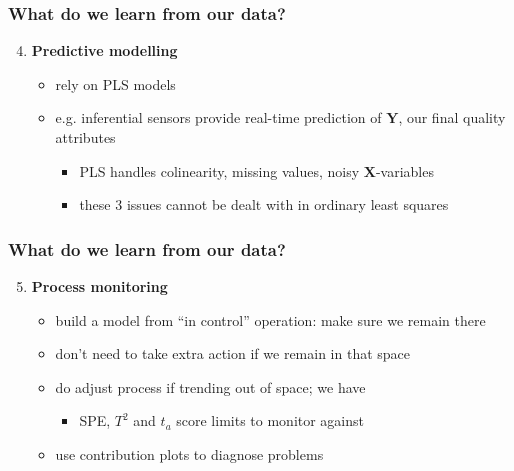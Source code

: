 \begin{frame}\frametitle{What do we learn from our data?}

\begin{enumerate}
	\setcounter{enumi}{3}
	\item {\bf \color{myGreen}Predictive modelling} 
	\begin{itemize}
		\item 	rely on PLS models
		\item 	e.g. inferential sensors provide real-time prediction of \( \mathbf{Y} \), our final quality attributes
		\begin{itemize}
			\item 	PLS handles colinearity, missing values, noisy \( \mathbf{X} \)-variables
			\item 	these 3 issues cannot be dealt with in ordinary least squares
		\end{itemize}
	\end{itemize}	
\end{enumerate}
\end{frame}

\begin{frame}\frametitle{What do we learn from our data?}

\begin{enumerate}
	\setcounter{enumi}{4}
	\item {\bf \color{myGreen}Process monitoring} 
	\begin{itemize}
		\item 	build a model from ``in control'' operation: make sure we remain there
		\item 	don't need to take extra action if we remain in that space
		\item 	do adjust process if trending out of space; we have
		\begin{itemize}
			\item 	SPE, \( T^2 \) and \( t_a \) score limits to monitor against
		\end{itemize}
		
		\item 	use contribution plots to diagnose problems
	\end{itemize}	
\end{enumerate}
\end{frame}

